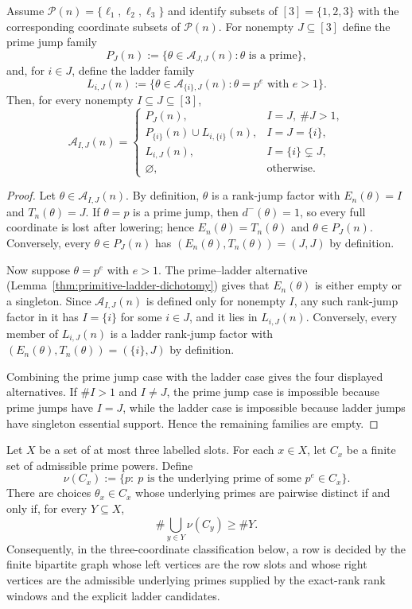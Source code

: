 \begin{lemma}
\label{lem:three-coordinate-rank-jump-families}
Assume $\mathcal P(n)=\{\ell_1,\ell_2,\ell_3\}$ and identify subsets of
$[3]=\{1,2,3\}$ with the corresponding coordinate subsets of
$\mathcal P(n)$. For nonempty $J\subseteq[3]$ define the prime jump family
\[
P_J(n):=\{\theta\in\mathcal A_{J,J}(n):\theta\text{ is a prime}\},
\]
and, for $i\in J$, define the ladder family
\[
L_{i,J}(n):=\{\theta\in\mathcal A_{\{i\},J}(n):
\theta=p^e\text{ with }e>1\}.
\]
Then, for every nonempty $I\subseteq J\subseteq[3]$,
\[
\mathcal A_{I,J}(n)=
\begin{cases}
P_J(n), & I=J,\ \#J>1,\\[1mm]
P_{\{i\}}(n)\cup L_{i,\{i\}}(n), & I=J=\{i\},\\[1mm]
L_{i,J}(n), & I=\{i\}\subsetneq J,\\[1mm]
\varnothing, & \text{otherwise.}
\end{cases}
\]
\end{lemma}

\begin{proof}
Let $\theta\in\mathcal A_{I,J}(n)$. By definition, $\theta$ is a rank-jump factor with
$E_n(\theta)=I$ and $T_n(\theta)=J$. If $\theta=p$ is a prime jump, then
$d^-(\theta)=1$, so every full coordinate is lost after lowering; hence
$E_n(\theta)=T_n(\theta)$ and $\theta\in P_J(n)$. Conversely, every
$\theta\in P_J(n)$ has $(E_n(\theta),T_n(\theta))=(J,J)$ by definition.

Now suppose $\theta=p^e$ with $e>1$. The prime--ladder alternative
(Lemma~\ref{thm:primitive-ladder-dichotomy}) gives that $E_n(\theta)$ is
either empty or a singleton. Since $\mathcal A_{I,J}(n)$ is defined only for
nonempty $I$, any such rank-jump factor in it has $I=\{i\}$ for some $i\in J$, and it
lies in $L_{i,J}(n)$. Conversely, every member of $L_{i,J}(n)$ is a ladder
rank-jump factor with $(E_n(\theta),T_n(\theta))=(\{i\},J)$ by definition.

Combining the prime jump case with the ladder case gives the four displayed
alternatives. If $\#I>1$ and $I\ne J$, the prime jump case is impossible
because prime jumps have $I=J$, while the ladder case is impossible
because ladder jumps have singleton essential support. Hence the remaining
families are empty.
\end{proof}

\begin{lemma}
\label{lem:finite-slot-selection}
Let $X$ be a set of at most three labelled slots.  For each $x\in X$, let
$C_x$ be a finite set of admissible prime powers.  Define
\[
 \nu(C_x):=\{p:\ p\text{ is the underlying prime of some }p^e\in C_x\}.
\]
There are choices $\theta_x\in C_x$ whose underlying primes are pairwise
distinct if and only if, for every $Y\subseteq X$,
\[
\#\bigcup_{y\in Y}\nu(C_y)\ge \#Y .
\]
Consequently, in the three-coordinate classification below, a row is decided
by the finite bipartite graph whose left vertices are the row slots and whose
right vertices are the admissible underlying primes supplied by the exact-rank
rank windows and the explicit ladder candidates.
\end{lemma}

